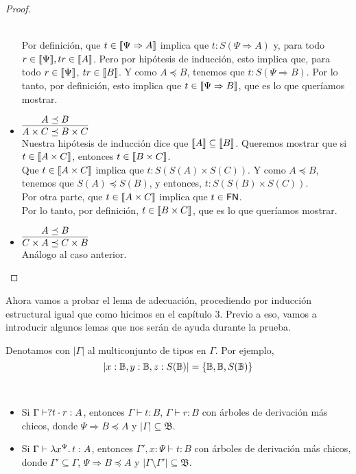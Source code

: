 \begin{proof}
\begin{itemize}
      \\ Por definición, que \( t \in \llbracket\Psi \Rightarrow A\rrbracket \) implica que \( t : S(\Psi \Rightarrow A) \) y, para todo \( r \in \llbracket\Psi\rrbracket, t r \in \llbracket A\rrbracket \). Pero por hipótesis de inducción, esto implica que, para todo \( r \in \llbracket\Psi\rrbracket \), \( t r \in \llbracket B\rrbracket \). Y como \( A \preceq B \), tenemos que \( t : S(\Psi \Rightarrow B) \). Por lo tanto, por definición, esto implica que \( t \in \llbracket\Psi \Rightarrow B\rrbracket \), que es lo que queríamos mostrar.
    \item \( \infer{A \times C \preceq B \times C}{A \preceq B} \)
      \\ Nuestra hipótesis de inducción dice que \( \llbracket A\rrbracket \subseteq \llbracket B\rrbracket \). Queremos mostrar que si \( t \in \llbracket A \times C\rrbracket \), entonces \( t \in \llbracket B \times C\rrbracket \).
      \\ Que \( t \in \llbracket A \times C\rrbracket \) implica que \( t : S(S(A) \times S(C)) \). Y como \( A \preceq B \), tenemos que \( S(A) \preceq S(B) \), y entonces, \( t : S(S(B) \times S(C)) \).
      \\ Por otra parte, que \( t \in \llbracket A \times C\rrbracket \) implica que \( t \in \mathsf{FN} \).
      \\ Por lo tanto, por definición, \( t \in \llbracket B \times C\rrbracket \), que es lo que queríamos mostrar.
    \item \( \infer{C \times A \preceq C \times B}{A \preceq B} \)
      \\ Análogo al caso anterior.
      \qedhere
  \end{itemize}
\end{proof}

Ahora vamos a probar el lema de adecuación, procediendo por inducción estructural igual que como hicimos en el capítulo 3. Previo a eso, vamos a introducir algunos lemas que nos serán de ayuda durante la prueba.

\begin{definition}
  Denotamos con \( |\Gamma| \) al multiconjunto de tipos en \( \Gamma \). Por ejemplo,
  \[
    |x : \mathbb{B}, y : \mathbb{B}, z : S(\mathbb{B})| = \{ \mathbb{B}, \mathbb{B}, S(\mathbb{B}) \}
  \]
\end{definition}

\begin{lemma}[Generación]
  ~\label{lem:generation}
  \begin{itemize}
  \item Si \( \Gamma \vdash ? t \cdot r : A \), entonces \( \Gamma \vdash t : B \), \( \Gamma \vdash r : B \) con árboles de derivación más chicos, donde \( \Psi \Rightarrow B \preceq A \) y \( |\Gamma| \subseteq \mathfrak{B} \).
  \item Si \( \Gamma \vdash \lambda x^{\Psi}\ldotp t : A \), entonces \( \Gamma',x : \Psi \vdash t : B \) con árboles de derivación más chicos, donde \( \Gamma' \subseteq \Gamma \), \( \Psi \Rightarrow B \preceq A \) y \( |\Gamma\setminus\Gamma'|\subseteq \mathfrak{B} \).
  \end{itemize}
\end{lemma}

